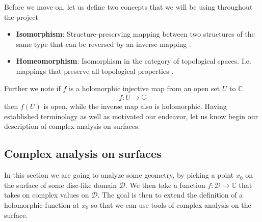 \documentclass[lettersize,11pt]{article}
\begin{document}
Before we move on, let us define two concepts that we will be using throughout the project
	\begin{itemize}
	\item \textbf{Isomorphism}: Structure-preserving mapping between two structures of the same type that can be reversed by an inverse mapping \cite{wiki:1}.
	\item \textbf{Homeomorphism}: Isomorphism in the category of topological spaces. I.e. mappings that preserve all topological properties \cite{wiki:2}.
\end{itemize}
Further we note if $f$ is a holomorphic injective map from an open set $U$ to $\mathds{C}$
\begin{equation}
	\begin{aligned}
		f:U \to \mathds{C}
	\end{aligned}
\end{equation}
then $f(U)$ is open, while the inverse map also is holomorphic. Having established terminology as well as motivated our endeavor, let us know begin our description of complex analysis on surfaces.
\subsection{Complex analysis on surfaces}
In this section we are going to analyze some geometry, by picking a point $x_0$ on the surface of some disc-like domain $\mathcal{D}$. We then take a function $f:\mathcal{D}\to \mathds{C}$ that takes on complex values on $\mathcal{D}$. The goal is then to extend the definition of a holomorphic function at $x_0$ so that we can use tools of complex analysis on the surface.
\end{document}
